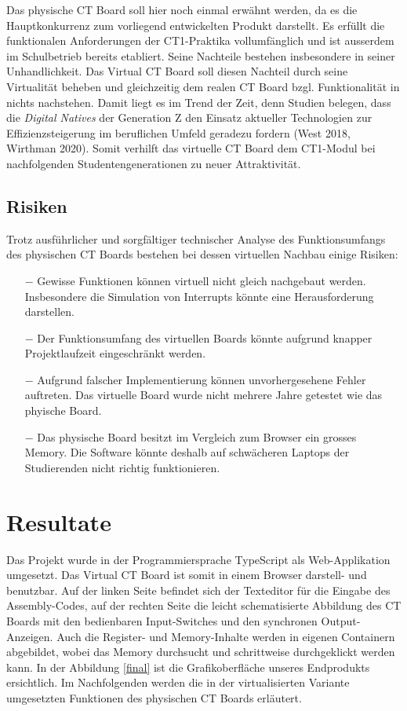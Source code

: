 \documentclass[10pt]{article}
\begin{document}
Das physische CT Board soll hier noch einmal erwähnt werden, da es die Hauptkonkurrenz zum vorliegend entwickelten Produkt darstellt. Es erfüllt die funktionalen Anforderungen der CT1-Praktika vollumfänglich und ist ausserdem im Schulbetrieb bereits etabliert. Seine Nachteile bestehen insbesondere in seiner Unhandlichkeit. Das \glqq Virtual CT Board\grqq{} soll diesen Nachteil durch seine Virtualität beheben und gleichzeitig dem realen CT Board bzgl. Funktionalität in nichts nachstehen. Damit liegt es im Trend der Zeit, denn Studien belegen, dass die \emph{Digital Natives} der Generation Z den Einsatz aktueller Technologien zur Effizienzsteigerung im beruflichen Umfeld geradezu fordern (West 2018, Wirthman 2020). Somit verhilft das virtuelle CT Board dem CT1-Modul bei nachfolgenden Studentengenerationen zu neuer Attraktivität.


\subsection{Risiken}
Trotz ausführlicher und sorgfältiger technischer Analyse des Funktionsumfangs des physischen CT Boards bestehen bei dessen virtuellen Nachbau einige Risiken:
\begin{itemize}
\item[$-$] Gewisse Funktionen können virtuell nicht gleich nachgebaut werden. Insbesondere die Simulation von Interrupts könnte eine Herausforderung darstellen.
\item[$-$] Der Funktionsumfang des virtuellen Boards könnte aufgrund knapper Projektlaufzeit eingeschränkt werden. 
\item[$-$] Aufgrund falscher Implementierung können unvorhergesehene Fehler auftreten. Das virtuelle Board wurde nicht mehrere Jahre getestet wie das phyische Board.
\item[$-$] Das physische Board besitzt im Vergleich zum Browser ein grosses Memory. Die Software könnte deshalb auf schwächeren Laptops der Studierenden nicht richtig funktionieren. 
\end{itemize}

\section{Resultate}

Das Projekt wurde in der Programmiersprache TypeScript als Web-Applikation umgesetzt. Das \glqq Virtual CT Board\grqq{} ist somit in einem Browser darstell- und benutzbar. Auf der linken Seite befindet sich der Texteditor für die Eingabe des Assembly-Codes, auf der rechten Seite die leicht schematisierte Abbildung des CT Boards mit den bedienbaren Input-Switches und den synchronen Output-Anzeigen. Auch die Register- und Memory-Inhalte werden in eigenen Containern abgebildet, wobei das Memory durchsucht und schrittweise durchgeklickt werden kann. In der Abbildung \ref{final} ist die Grafikoberfläche unseres Endprodukts ersichtlich. Im Nachfolgenden werden die in der virtualisierten Variante umgesetzten Funktionen des physischen CT Boards erläutert.
\end{document}
